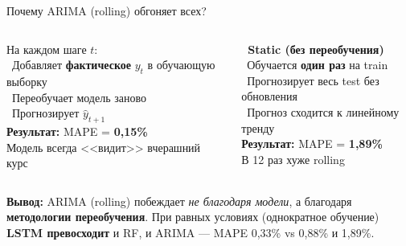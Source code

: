 \begin{frame}[shrink=10]{Почему ARIMA (rolling) обгоняет всех?}

  \begin{columns}[T]
    \begin{tcolorbox}[formulabox, title={\faSync\ Rolling Forecast}]
      \small
      На каждом шаге $t$:\\[3pt]
      \textcolor{accent}{\faAngleRight}~Добавляет \textbf{фактическое} $y_t$ в обучающую выборку\\[3pt]
      \textcolor{accent}{\faAngleRight}~Переобучает модель заново\\[3pt]
      \textcolor{accent}{\faAngleRight}~Прогнозирует $\hat{y}_{t+1}$\\[6pt]
      \textbf{Результат:} MAPE = \textcolor{success}{\textbf{0,15\%}}\\
      Модель всегда <<видит>> вчерашний курс
    \end{tcolorbox}

    \begin{tcolorbox}[warnbox]
      \small \textbf{\faLock\ Static (без переобучения)}\\[6pt]
      \textcolor{accent}{\faAngleRight}~Обучается \textbf{один раз} на train\\[3pt]
      \textcolor{accent}{\faAngleRight}~Прогнозирует весь test без обновления\\[3pt]
      \textcolor{accent}{\faAngleRight}~Прогноз сходится к линейному тренду\\[6pt]
      \textbf{Результат:} MAPE = \textcolor{danger}{\textbf{1,89\%}}\\
      В 12 раз хуже rolling
    \end{tcolorbox}
  \end{columns}

  \vspace{0.3cm}
  \begin{tcolorbox}[successbox]
    \small \textbf{Вывод:} ARIMA (rolling) побеждает \textit{не благодаря модели}, а благодаря \textbf{методологии переобучения}. При равных условиях (однократное обучение) \textbf{LSTM превосходит} и RF, и ARIMA --- MAPE 0,33\% vs 0,88\% и 1,89\%.
  \end{tcolorbox}
\end{frame}
